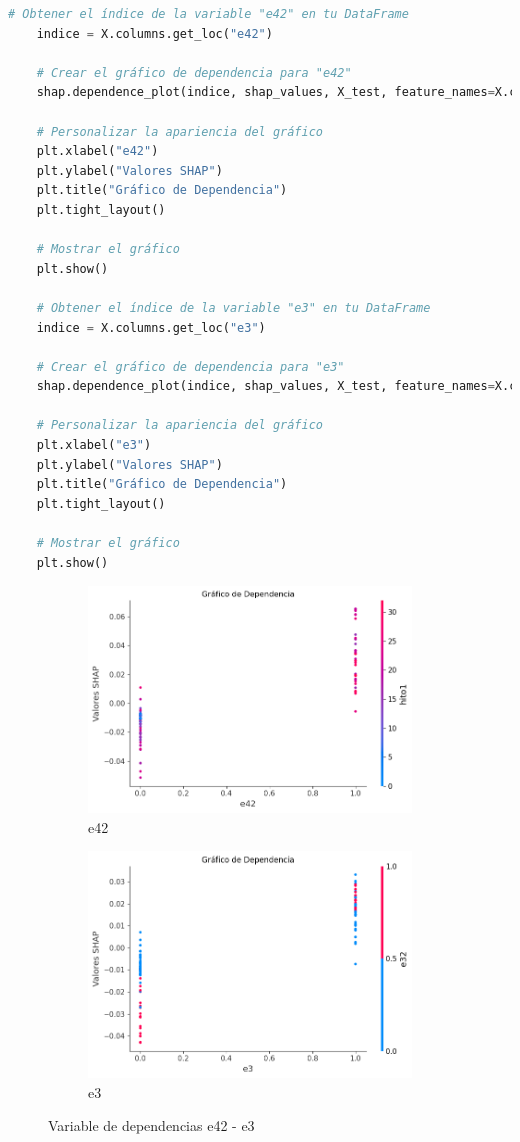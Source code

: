 \begin{lstlisting}[language=Python, caption=Grafico de dependencia e42 e3, label=lst:grafDepe42e3]
    # Obtener el índice de la variable "e42" en tu DataFrame
    indice = X.columns.get_loc("e42")
    
    # Crear el gráfico de dependencia para "e42"
    shap.dependence_plot(indice, shap_values, X_test, feature_names=X.columns, show=False)
    
    # Personalizar la apariencia del gráfico
    plt.xlabel("e42")
    plt.ylabel("Valores SHAP")
    plt.title("Gráfico de Dependencia")
    plt.tight_layout()
    
    # Mostrar el gráfico
    plt.show()

    # Obtener el índice de la variable "e3" en tu DataFrame
    indice = X.columns.get_loc("e3")
    
    # Crear el gráfico de dependencia para "e3"
    shap.dependence_plot(indice, shap_values, X_test, feature_names=X.columns, show=False)
    
    # Personalizar la apariencia del gráfico
    plt.xlabel("e3")
    plt.ylabel("Valores SHAP")
    plt.title("Gráfico de Dependencia")
    plt.tight_layout()
    
    # Mostrar el gráfico
    plt.show()
\end{lstlisting}

\begin{figure}[H]
    \begin{subfigure}{0.48\textwidth}
        \includegraphics[width=0.9\linewidth, height=6cm]{img/shap_rf/e42.png}
        \caption{e42}
        \label{fig:dependencia_e42}
    \end{subfigure}
    \begin{subfigure}{0.5\textwidth}
        \includegraphics[width=0.9\linewidth, height=6cm]{img/shap_rf/e3.png}
        \caption{e3}
        \label{fig:dependencia_e3}
    \end{subfigure}
    \caption{Variable de dependencias e42 - e3}
    \label{fig:image3}
\end{figure}

